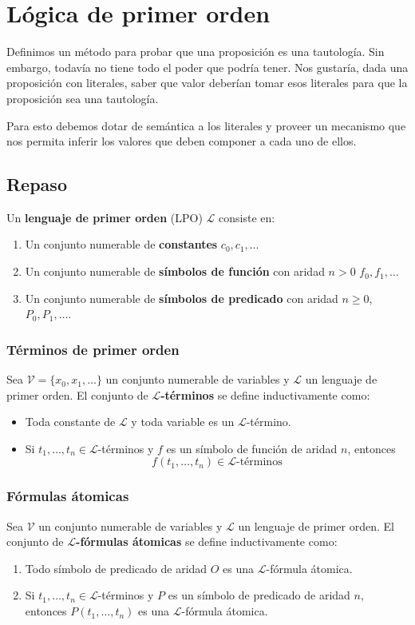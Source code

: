 \section{Lógica de primer orden}
Definimos un método para probar que una proposición es una tautología. Sin embargo, todavía no tiene todo el poder que podría tener. Nos gustaría, dada una proposición con literales, saber que valor deberían tomar esos literales para que la proposición sea una tautología.

Para esto debemos dotar de semántica a los literales y proveer un mecanismo que nos permita inferir los valores que deben componer a cada uno de ellos.

\subsection{Repaso}
Un \textbf{lenguaje de primer orden} (LPO) $\mathcal{L}$ consiste en:
\begin{enumerate}
\item Un conjunto numerable de \textbf{constantes} $c_0,c_1,\dots$
\item Un conjunto numerable de \textbf{símbolos de función} con aridad $n > 0$ $f_0, f_1,\dots$
\item Un conjunto numerable de \textbf{símbolos de predicado} con aridad $n\geq 0$, $P_0,P_1,\dots$.
\end{enumerate}

\subsubsection{Términos de primer orden}
Sea $\mathcal{V} = \{x_0,x_1,\dots\}$ un conjunto numerable de variables y $\mathcal{L}$ un lenguaje de primer orden. El conjunto de \textbf{$\mathcal{L}$-términos} se define inductivamente como:
\begin{itemize}
\item Toda constante de $\mathcal{L}$ y toda variable es un $\mathcal{L}$-término.
\item Si $t_1,\dots,t_n\in \mathcal{L}$-términos y $f$ es un símbolo de función de aridad $n$, entonces $$f(t_1,\dots,t_n)\in \mathcal{L}\text{-términos}$$
\end{itemize}

\subsubsection{Fórmulas átomicas}
Sea $\mathcal{V}$ un conjunto numerable de variables y $\mathcal{L}$ un lenguaje de primer orden. El conjunto de \textbf{$\mathcal{L}$-fórmulas átomicas} se define inductivamente como:
\begin{enumerate}
\item Todo símbolo de predicado de aridad $O$ es una $\mathcal{L}$-fórmula átomica.
\item Si $t_1,\dots,t_n\in\mathcal{L}$-términos y $P$ es un símbolo de predicado de aridad $n$, entonces $P(t_1,\dots,t_n)$ es una $\mathcal{L}$-fórmula átomica.
\end{enumerate}
